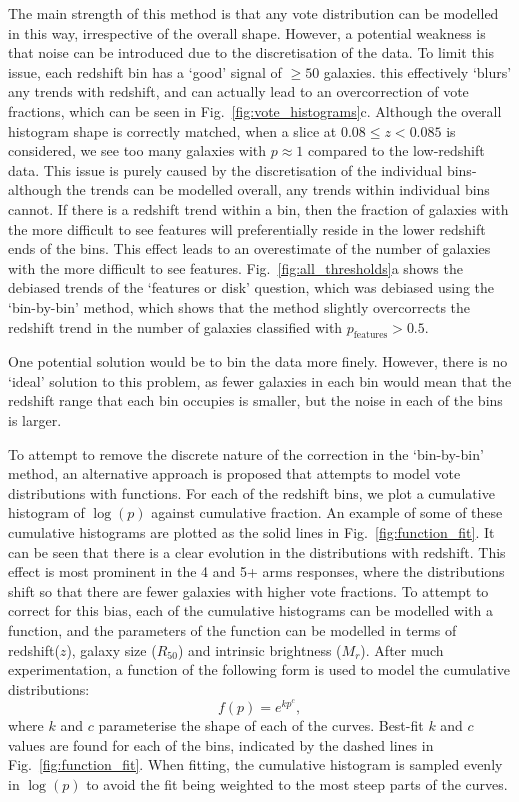 \documentclass[useAMS,usenatbib]{mn2e}
\begin{document}
The main strength of this method is that any vote distribution can be modelled in this way, irrespective of the overall shape. However, a potential weakness is that noise can be introduced due to the discretisation of the data. To limit this issue, each redshift bin has a `good' signal of $\geq50$ galaxies. this effectively `blurs' any trends with redshift, and can actually lead to an overcorrection of vote fractions, which can be seen in Fig.~\ref{fig:vote_histograms}c. Although the overall histogram shape is correctly matched, when a slice at $0.08 \leq z < 0.085$ is considered, we see too many galaxies with $p \approx 1$ compared to the low-redshift data. This issue is purely caused by the discretisation of the individual bins- although the trends can be modelled overall, any trends within individual bins cannot. If there is a redshift trend within a bin, then the fraction of galaxies with the more difficult to see features will preferentially reside in the lower redshift ends of the bins. This effect leads to an overestimate of the number of galaxies with the more difficult to see features. Fig.~\ref{fig:all_thresholds}a shows the debiased trends of the `features or disk' question, which was debiased using the `bin-by-bin' method, which shows that the method slightly overcorrects the redshift trend in the number of galaxies classified with $p_{\mathrm{features}} > 0.5.$

One potential solution would be to bin the data more finely. However, there is no `ideal' solution to this problem, as fewer galaxies in each bin would mean that the redshift range that each bin occupies is smaller, but the noise in each of the bins is larger. 

To attempt to remove the discrete nature of the correction in the `bin-by-bin' method, an alternative approach is proposed that attempts to model vote distributions with functions. For each of the redshift bins, we plot a cumulative histogram of $\log(p)$ against cumulative fraction. An example of some of these cumulative histograms are plotted as the solid lines in Fig.~\ref{fig:function_fit}. It can be seen that there is a clear evolution in the distributions with redshift. This effect is most prominent in the 4 and 5+ arms responses, where the distributions shift so that there are fewer galaxies with higher vote fractions. To attempt to correct for this bias, each of the cumulative histograms can be modelled with a function, and the parameters of the function can be modelled in terms of redshift($z$), galaxy size ($R_{50}$) and intrinsic brightness ($M_r$). After much experimentation, a function of the following form is used to model the cumulative distributions:
\begin{equation}
f(p) = e^{kp^{c}}\mathrm{,}
\end{equation} where $k$ and $c$ parameterise the shape of each of the curves. Best-fit $k$ and $c$ values are found for each of the bins, indicated by the dashed lines in Fig.~\ref{fig:function_fit}. When fitting, the cumulative histogram is sampled evenly in $\log(p)$ to avoid the fit being weighted to the most steep parts of the curves. 
\end{document}
